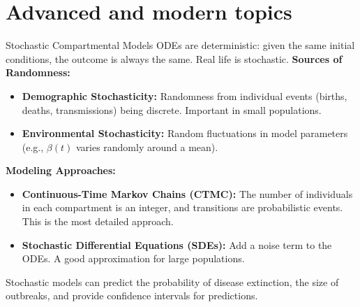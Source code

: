 \documentclass[aspectratio=169]{beamer}\usepackage[]{graphicx}\usepackage[]{xcolor}
\begin{document}
\section{Advanced and modern topics}

\begin{frame}{Stochastic Compartmental Models}
    ODEs are deterministic: given the same initial conditions, the outcome is always the same. Real life is stochastic.
    \vfill
    \textbf{Sources of Randomness:}
    \begin{itemize}
        \item \textbf{Demographic Stochasticity:} Randomness from individual events (births, deaths, transmissions) being discrete. Important in small populations.
        \item \textbf{Environmental Stochasticity:} Random fluctuations in model parameters (e.g., $\beta(t)$ varies randomly around a mean).
    \end{itemize}
    \vfill
    \textbf{Modeling Approaches:}
    \begin{itemize}
        \item \textbf{Continuous-Time Markov Chains (CTMC):} The number of individuals in each compartment is an integer, and transitions are probabilistic events. This is the most detailed approach.
        \item \textbf{Stochastic Differential Equations (SDEs):} Add a noise term to the ODEs. A good approximation for large populations.
    \end{itemize}
    \vfill
    Stochastic models can predict the probability of disease extinction, the size of outbreaks, and provide confidence intervals for predictions.
\end{frame}
\end{document}
